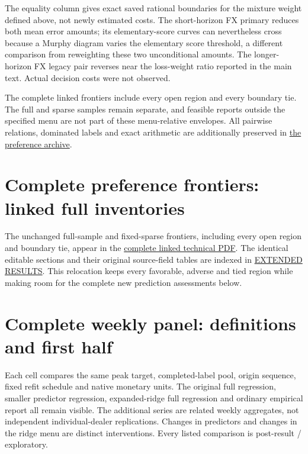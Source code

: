 \documentclass[11pt,a4paper]{article}
\begin{document}
The equality column gives exact saved rational boundaries for the mixture
weight defined above, not newly estimated costs. The short-horizon FX primary reduces both mean error amounts;
its elementary-score curves can nevertheless cross because a Murphy diagram
varies the elementary score threshold, a different comparison from reweighting
these two unconditional amounts. The longer-horizon FX legacy pair reverses
near the loss-weight ratio reported in the main text. Actual decision costs
were not observed.

The complete linked frontiers include every open region and every boundary tie.
The full and sparse samples remain separate, and feasible reports outside the
specified menu are not part of these menu-relative envelopes. All pairwise
relations, dominated labels and exact arithmetic are additionally preserved in
\href{https://github.com/ByronLi0207/financial-mathematics-paper-20261020/blob/revision-v7-final/results/revision-20261022/preference-robustness/README.md}{the preference archive}.\section{Complete preference frontiers: linked full inventories}\label{sup:frontier-0}\label{sup:frontier-8}

The unchanged full-sample and fixed-sparse frontiers, including every open region and boundary tie, appear in the \href{https://github.com/ByronLi0207/financial-mathematics-paper-20261020/blob/revision-v8-goal/submission-jof/extended-v9-technical.pdf}{complete linked technical PDF}. The identical editable sections and their original source-field tables are indexed in \href{https://github.com/ByronLi0207/financial-mathematics-paper-20261020/blob/revision-v8-goal/EXTENDED_RESULTS.md}{EXTENDED RESULTS}. This relocation keeps every favorable, adverse and tied region while making room for the complete new prediction assessments below.

\section{Complete weekly panel: definitions and first half}\label{sup:panel}

Each cell compares the same peak target, completed-label pool,
origin sequence, fixed refit schedule and native monetary units. The original
full regression, smaller predictor regression, expanded-ridge full regression
and ordinary empirical report all remain visible. The additional series are
related weekly aggregates, not independent individual-dealer replications.
Changes in predictors and changes in the ridge menu are distinct interventions.
Every listed comparison is post-result / exploratory.
\end{document}
